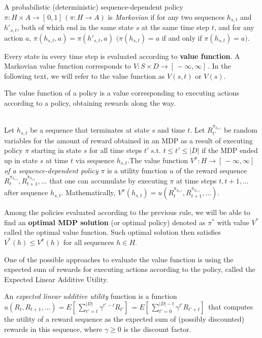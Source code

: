 \newpage

\begin{definition}
A probabilistic (deterministic) sequence-dependent policy $\pi: H \times A \rightarrow [ \,0, 1] \,(\pi: H \rightarrow A)$ is \textit{Markovian} if for any two sequences $h_{s,t}$ and $h'_{s,t}$, both of which end in the same state $s$ at the same time step $t$, and for any action $a$, 
$\pi(h_{s,t}, a) = \pi(h'_{s,t}, a)$ $(\pi(h_{s,t}) = a$ if and only if $\pi(h_{s,t}) = a)$.
\end{definition}

Every state in every time step is evaluated according to \textbf{value function}. A Markovian value function corresponds to $ V: S \times D 
\rightarrow [ \,-\infty, \infty] \,$. In the following text, we will refer to the value function as $V(s, t)$ or $V(s)$.

The value function of a policy is a value corresponding to executing actions according to a policy, obtaining rewards along the way. \\ \\

\begin{definition}
Let $h_{s,t}$ be a sequence that terminates at state $s$ and time $t$. Let $R^{\pi_{h_{s,t}}}_{t'}$ be random variables for the amount of reward obtained in an MDP as a result of executing policy $\pi$ starting in state $s$ for all time steps $t'$ s.t. $t \leqslant t' \leqslant |D|$ if the MDP ended up in state $s$ at time $t$ via sequence $h_{s,t}$.The value function $V^{\pi}: H \rightarrow [ \,−\infty,\infty] \,$ \textit{of a sequence-dependent policy} $\pi$ is a utility function $u$ of the reward sequence $R^{\pi_{h_{s,t}}}_t, R^{\pi_{h_{s,t}}}_{t+1}, \ldots$ that one can accumulate by executing $\pi$ at time steps $t, t + 1,\ldots$  after sequence $h_{s,t}$. Mathematically, $V^{\pi} (h_{s,t}) = u(R^{\pi_{h_{s,t}}}_t , R^{\pi_{h_{s,t}}}_{t+1}, \ldots)$.
\end{definition}

Among the policies evaluated according to the previous rule, we will be able to find an \textbf{optimal MDP solution} (or optimal policy) denoted as $\pi^*$ with value $V^*$ called the optimal value function. Such optimal solution then satisfies $V^{*} (h) \leqslant V^{\pi} (h)$ for all sequences $h \in H$.

One of the possible approaches to evaluate the value function is using the expected sum of rewards for executing actions according to the policy, called the Expected Linear Additive Utility.
\\
\begin{definition}
An \textit{expected linear additive utility} function is a function $u(R_t, R_{t+1}, \ldots) = E[ \,\sum_{t'=t}^{|D|} \gamma ^{t'−t} R_{t'}] \, = E[ \,\sum_{t'=0}^{|D|-t} \gamma^{t'} R_{t'+t}] \,$ that computes the utility of a
reward sequence as the expected sum of (possibly discounted) rewards in this sequence, where $\gamma \geqslant 0$
is the discount factor.
\end{definition}

